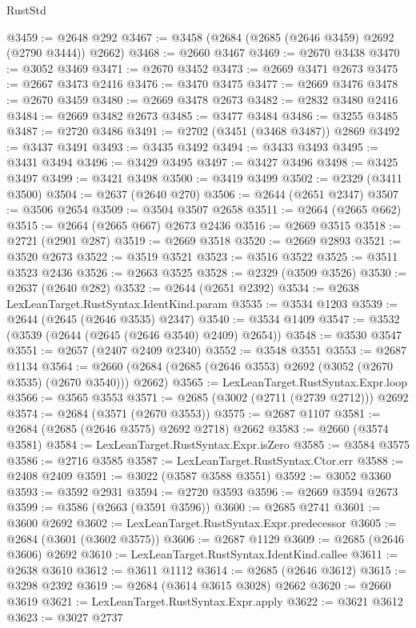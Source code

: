 \begin{lexlean}{RustStd}
\begin{coremodule}
@3459 := @2648 @292
@3467 := @3458 (@2684 (@2685 (@2646 @3459) @2692 (@2790 @3444)) @2662)
@3468 := @2660 @3467
@3469 := @2670 @3438
@3470 := @3052 @3469
@3471 := @2670 @3452
@3473 := @2669 @3471 @2673
@3475 := @2667 @3473 @2416
@3476 := @3470 @3475
@3477 := @2669 @3476
@3478 := @2670 @3459
@3480 := @2669 @3478 @2673
@3482 := @2832 @3480 @2416
@3484 := @2669 @3482 @2673
@3485 := @3477 @3484
@3486 := @3255 @3485
@3487 := @2720 @3486
@3491 := @2702 (@3451 (@3468 @3487)) @2869
@3492 := @3437 @3491
@3493 := @3435 @3492
@3494 := @3433 @3493
@3495 := @3431 @3494
@3496 := @3429 @3495
@3497 := @3427 @3496
@3498 := @3425 @3497
@3499 := @3421 @3498
@3500 := @3419 @3499
@3502 := @2329 (@3411 @3500)
@3504 := @2637 (@2640 @270)
@3506 := @2644 (@2651 @2347)
@3507 := @3506 @2654
@3509 := @3504 @3507 @2658
@3511 := @2664 (@2665 @662)
@3515 := @2664 (@2665 @667) @2673 @2436
@3516 := @2669 @3515
@3518 := @2721 (@2901 @287)
@3519 := @2669 @3518
@3520 := @2669 @2893
@3521 := @3520 @2673
@3522 := @3519 @3521
@3523 := @3516 @3522
@3525 := @3511 @3523 @2436
@3526 := @2663 @3525
@3528 := @2329 (@3509 @3526)
@3530 := @2637 (@2640 @282)
@3532 := @2644 (@2651 @2392)
@3534 := @2638 LexLeanTarget.RustSyntax.IdentKind.param
@3535 := @3534 @1203
@3539 := @2644 (@2645 (@2646 @3535) @2347)
@3540 := @3534 @1409
@3547 := @3532 (@3539 (@2644 (@2645 (@2646 @3540) @2409) @2654))
@3548 := @3530 @3547
@3551 := @2657 (@2407 @2409 @2340)
@3552 := @3548 @3551
@3553 := @2687 @1134
@3564 := @2660 (@2684 (@2685 (@2646 @3553) @2692 (@3052 (@2670 @3535) (@2670 @3540))) @2662)
@3565 := LexLeanTarget.RustSyntax.Expr.loop
@3566 := @3565 @3553
@3571 := @2685 (@3002 (@2711 (@2739 @2712))) @2692
@3574 := @2684 (@3571 (@2670 @3553))
@3575 := @2687 @1107
@3581 := @2684 (@2685 (@2646 @3575) @2692 @2718) @2662
@3583 := @2660 (@3574 @3581)
@3584 := LexLeanTarget.RustSyntax.Expr.isZero
@3585 := @3584 @3575
@3586 := @2716 @3585
@3587 := LexLeanTarget.RustSyntax.Ctor.err
@3588 := @2408 @2409
@3591 := @3022 (@3587 @3588 @3551)
@3592 := @3052 @3360
@3593 := @3592 @2931
@3594 := @2720 @3593
@3596 := @2669 @3594 @2673
@3599 := @3586 (@2663 (@3591 @3596))
@3600 := @2685 @2741
@3601 := @3600 @2692
@3602 := LexLeanTarget.RustSyntax.Expr.predecessor
@3605 := @2684 (@3601 (@3602 @3575))
@3606 := @2687 @1129
@3609 := @2685 (@2646 @3606) @2692
@3610 := LexLeanTarget.RustSyntax.IdentKind.callee
@3611 := @2638 @3610
@3612 := @3611 @1112
@3614 := @2685 (@2646 @3612)
@3615 := @3298 @2392
@3619 := @2684 (@3614 @3615 @3028) @2662
@3620 := @2660 @3619
@3621 := LexLeanTarget.RustSyntax.Expr.apply
@3622 := @3621 @3612
@3623 := @3027 @2737

\end{coremodule}
\end{lexlean}
